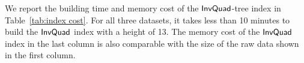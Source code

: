 We report the building time and memory cost of the $\mathsf{InvQuad}$-tree index in Table~\ref{tab:index cost}.
For all three datasets, it takes less than 10 minutes to build the $\mathsf{InvQuad}$ index with a height of 13.
The memory cost of the $\mathsf{InvQuad}$ index in the last column is also comparable with the size of the raw data shown in the first column.






%
%


